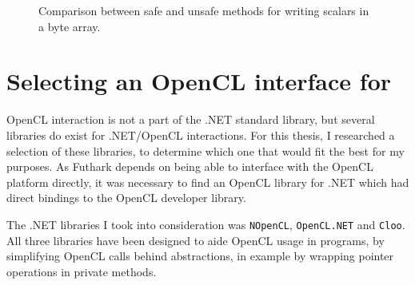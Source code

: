 \begin{figure}
    \caption{Comparison between safe and unsafe methods for writing scalars in a byte array.}
    \label{fig:shortperformancegraph}
\end{figure}

\section{Selecting an OpenCL interface for \csharp{}}
OpenCL interaction is not a part of the .NET standard library, but several
libraries do exist for .NET/OpenCL interactions. For this thesis, I researched a
selection of these libraries, to determine which one that would fit the best for
my purposes.
As Futhark depends on being able to interface with the OpenCL platform directly,
it was necessary to find an OpenCL library for .NET which had direct bindings to
the OpenCL developer library.

The .NET libraries I took into consideration was \texttt{NOpenCL}, \texttt{OpenCL.NET} and \texttt{Cloo}.
All three libraries have been designed to aide OpenCL usage in \csharp{}
programs, by simplifying OpenCL calls behind abstractions, in example by
wrapping pointer operations in private methods.
\\
\\

